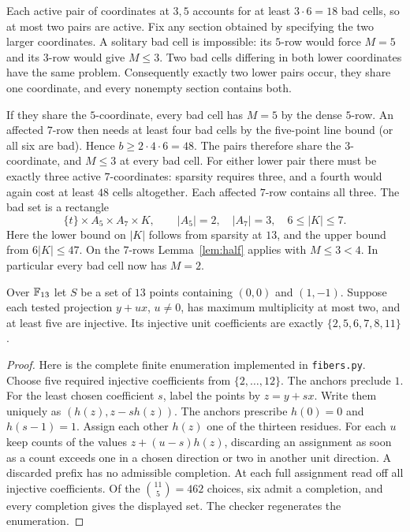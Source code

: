 Each active pair of coordinates at $3,5$ accounts for at least $3\cdot6=18$ bad cells, so at most two pairs are active. Fix any section obtained by specifying the two larger coordinates. A solitary bad cell is impossible: its $5$-row would force $M=5$ and its $3$-row would give $M\le3$. Two bad cells differing in both lower coordinates have the same problem. Consequently exactly two lower pairs occur, they share one coordinate, and every nonempty section contains both.

If they share the $5$-coordinate, every bad cell has $M=5$ by the dense $5$-row. An affected $7$-row then needs at least four bad cells by the five-point line bound (or all six are bad). Hence $b\ge 2\cdot4\cdot6=48$. The pairs therefore share the $3$-coordinate, and $M\le3$ at every bad cell. For either lower pair there must be exactly three active $7$-coordinates: sparsity requires three, and a fourth would again cost at least $48$ cells altogether. Each affected $7$-row contains all three. The bad set is a rectangle
\[
 \{t\}\times A_5\times A_7\times K,\qquad |A_5|=2,\quad |A_7|=3,\quad 6\le |K|\le7.
\]
Here the lower bound on $|K|$ follows from sparsity at $13$, and the upper bound from $6|K|\le47$. On the $7$-rows Lemma~\ref{lem:half} applies with $M\le3<4$. In particular every bad cell now has $M=2$.

\begin{lemma}\label{lem:sim}
Over $\mathbb F_{13}$ let $S$ be a set of $13$ points containing $(0,0)$ and $(1,-1)$. Suppose each tested projection $y+ux$, $u\ne0$, has maximum multiplicity at most two, and at least five are injective. Its injective unit coefficients are exactly $\{2,5,6,7,8,11\}$.
\end{lemma}
\begin{proof}
Here is the complete finite enumeration implemented in \texttt{fibers.py}. Choose five required injective coefficients from $\{2,\ldots,12\}$. The anchors preclude $1$. For the least chosen coefficient $s$, label the points by $z=y+sx$. Write them uniquely as $(h(z),z-sh(z))$. The anchors prescribe $h(0)=0$ and $h(s-1)=1$. Assign each other $h(z)$ one of the thirteen residues. For each $u$ keep counts of the values $z+(u-s)h(z)$, discarding an assignment as soon as a count exceeds one in a chosen direction or two in another unit direction. A discarded prefix has no admissible completion. At each full assignment read off all injective coefficients. Of the $\binom{11}{5}=462$ choices, six admit a completion, and every completion gives the displayed set. The checker regenerates the enumeration.
\end{proof}

